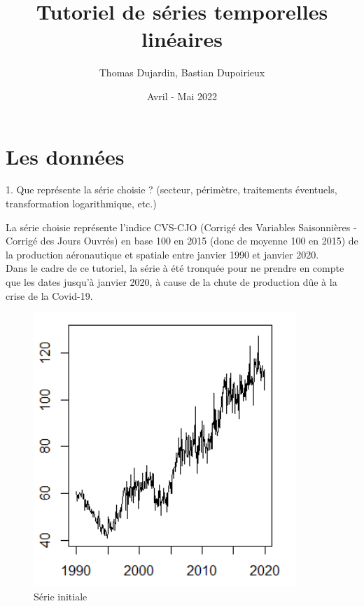 \documentclass[a4paper, 12pt]{article} %
\title{\textbf{Tutoriel de séries temporelles linéaires}}
\author{Thomas Dujardin, Bastian Dupoirieux}
\date{Avril - Mai 2022}
\begin{document}
\maketitle


\section{Les données}
\begin{tcolorbox}
{\small
1. Que représente la série choisie ? (secteur, périmètre, traitements éventuels, transformation logarithmique, etc.)}
\end{tcolorbox}
{\normalsize
{La série choisie représente l'indice CVS-CJO (Corrigé des Variables Saisonnières - Corrigé des Jours Ouvrés) en base 100 en 2015 (donc de moyenne 100 en 2015) de la production aéronautique et spatiale entre janvier 1990 et janvier 2020. 
\\
Dans le cadre de ce tutoriel, la série à été tronquée pour ne prendre en compte que les dates jusqu'à janvier 2020, à cause de la chute de production dûe à la crise de la Covid-19.}}

\begin{figure}[h]
    \centering
    \includegraphics[scale =0.7]{serie_ae.png}
    \caption{Série initiale}
\end{figure}
\end{document}
